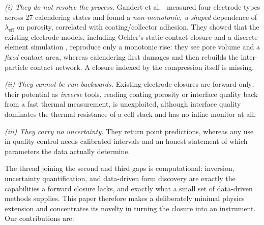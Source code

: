 \documentclass[10pt,a4paper]{article}
\newcommand{\leff}{\lambda_{\mathrm{eff}}}
\begin{document}
\emph{(i) They do not resolve the process.} Gandert et al.\ \cite{gandert2023} measured four electrode types across 27 calendering states and found a \emph{non-monotonic, u-shaped} dependence of $\leff$ on porosity, correlated with coating/collector adhesion. They showed that the existing electrode models, including Oehler's static-contact closure \cite{oehler2021} and a discrete-element simulation \cite{sangros2017}, reproduce only a monotonic rise: they see pore volume and a \emph{fixed} contact area, whereas calendering first damages and then rebuilds the inter-particle contact network. A closure indexed by the compression itself is missing.

\emph{(ii) They cannot be run backwards.} Existing electrode closures are forward-only; their potential as \emph{inverse} tools, reading coating porosity or interface quality back from a fast thermal measurement, is unexploited, although interface quality dominates the thermal resistance of a cell stack \cite{vishwakarma2015} and has no inline monitor at all.

\emph{(iii) They carry no uncertainty.} They return point predictions, whereas any use in quality control needs calibrated intervals and an honest statement of which parameters the data actually determine.

The thread joining the second and third gaps is computational: inversion, uncertainty quantification, and data-driven form discovery are exactly the capabilities a forward closure lacks, and exactly what a small set of data-driven methods supplies. This paper therefore makes a deliberately minimal physics extension and concentrates its novelty in turning the closure into an instrument. Our contributions are:
\end{document}
